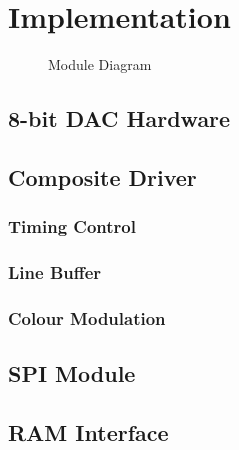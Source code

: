 \section{Implementation}

\begin{figure}[H]
    \centering
    \caption{Module Diagram}
\end{figure}

\subsection{8-bit DAC Hardware}


\subsection{Composite Driver}

\subsubsection{Timing Control}

\subsubsection{Line Buffer}

\subsubsection{Colour Modulation}

\subsection{SPI Module}

\subsection{RAM Interface}



